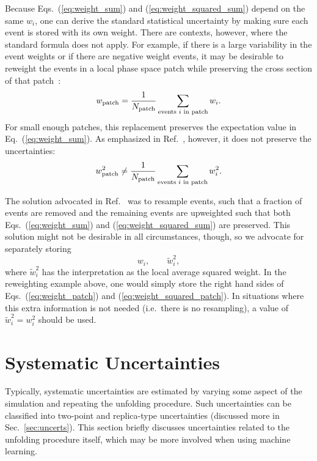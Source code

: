 \documentclass[a4paper,11pt]{article}
\DeclareRobustCommand{\Eq}[1]{Eq.~(\ref{eq:#1})}
\DeclareRobustCommand{\Eqs}[2]{Eqs.~(\ref{eq:#1}) and (\ref{eq:#2})}
\DeclareRobustCommand{\Ref}[1]{Ref.~\cite{#1}}
\begin{document}
Because \Eqs{weight_sum}{weight_squared_sum} depend on the same $w_i$, one can derive the standard statistical uncertainty by making sure each event is stored with its own weight.
%
There are contexts, however, where the standard formula does not apply.
%
For example, if there is a large variability in the event weights or if there are negative weight events, it may be desirable to reweight the events in a local phase space patch while preserving the cross section of that patch~\cite{Andersen:2020sjs}:
%
\begin{equation}
    \label{eq:weight_patch}
    w_{\rm patch} = \frac{1}{N_{\rm patch}} \sum_{\text{events $i$ in patch}}^{} w_i.
\end{equation}
%
For small enough patches, this replacement preserves the expectation value in \Eq{weight_sum}.
%
As emphasized in \Ref{Nachman:2020fff}, however, it does not preserve the uncertainties:
%
\begin{equation}
    \label{eq:weight_squared_patch}
    w_{\rm patch}^2 \not= \frac{1}{N_{\rm patch}} \sum_{\text{events $i$ in patch}}^{} w_i^2.
\end{equation}


The solution advocated in \Ref{Nachman:2020fff} was to resample events, such that a fraction of events are removed and the remaining events are upweighted such that both \Eqs{weight_sum}{weight_squared_sum} are preserved.
%
This solution might not be desirable in all circumstances, though, so we advocate for separately storing
%
\begin{equation}
w_i, \qquad \tilde{w}_i^2,
\end{equation}
%
where $\tilde{w}_i^2$ has the interpretation as the local average squared weight.
%
In the reweighting example above, one would simply store the right hand sides of \Eqs{weight_patch}{weight_squared_patch}.
%
In situations where this extra information is not needed (i.e.\ there is no resampling), a value of $\tilde{w}_i^2 = w_i^2$ should be used. %


\section{Systematic Uncertainties}
\label{Sec:systematics}

Typically, systematic uncertainties are estimated by varying some aspect of the simulation and repeating the unfolding procedure.  Such uncertainties can be classified into two-point and replica-type uncertainties (discussed more in Sec.~\ref{sec:uncerts}). This section briefly discusses uncertainties related to the unfolding procedure itself, which may be more involved when using machine learning.
\end{document}
